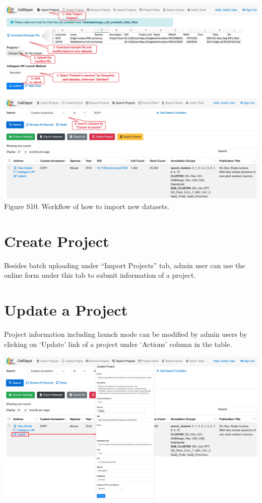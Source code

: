 \documentclass[
  openany]{book}
\begin{document}
\href{figures/S10.jpg}{\includegraphics{figures/S10.jpg}}
Figure S10. Workflow of how to import new datasets.

\hypertarget{create-project}{%
\section{Create Project}\label{create-project}}

Besides batch uploading under ``Import Projects'' tab, admin user can use the online form under this tab to submit information of a project.

\hypertarget{update-a-project}{%
\section{Update a Project}\label{update-a-project}}

Project information including launch mode can be modified by admin users by clicking on `Update' link of a project under `Actions' column in the table.

\href{figures/S11.jpg}{\includegraphics{figures/S11.jpg}}
\end{document}

